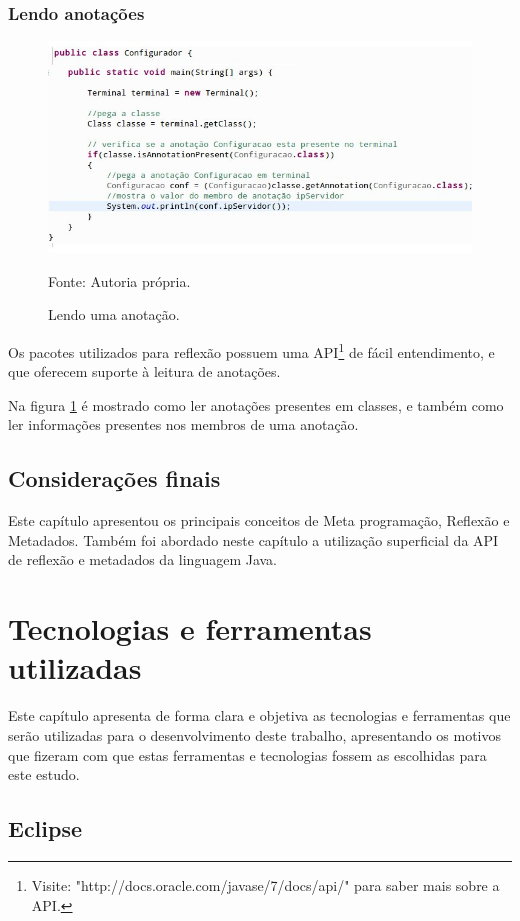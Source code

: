\documentclass[tc,oneside]{iiufrgs}
\begin{document}
\subsection{Lendo anotações}
\begin{figure}[ht]
	\centering
	\includegraphics[scale=0.5]{figuras/lendoAnnotation.jpg}
	\caption{Lendo uma anotação.}
	\small{Fonte: Autoria própria.}
	\label{fig:lendoAnotacao}
\end{figure}
Os pacotes utilizados para reflexão possuem uma API\footnote{Visite: "http://docs.oracle.com/javase/7/docs/api/"  para saber mais sobre a API.} de fácil entendimento, e que oferecem suporte à leitura de anotações.

Na figura \ref{fig:lendoAnotacao} é mostrado como ler anotações presentes em classes, e também como ler informações presentes nos membros de uma anotação.

\section{Considerações finais}
Este capítulo apresentou os principais conceitos de Meta programação, Reflexão e Metadados. Também foi abordado neste capítulo a utilização superficial da API de reflexão e metadados da linguagem Java. 

\chapter{Tecnologias e ferramentas utilizadas}
\label{cap5}
Este capítulo apresenta  de forma clara e objetiva as tecnologias e ferramentas que serão utilizadas para o desenvolvimento deste trabalho, apresentando os motivos que fizeram com que estas ferramentas e tecnologias fossem as escolhidas para este estudo.

\section{Eclipse}
\end{document}
